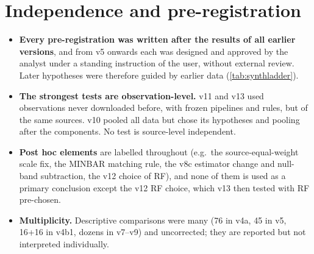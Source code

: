 \section{Independence and pre-registration}
\begin{itemize}
\item \textbf{Every pre-registration was written after the results of all earlier versions}, and from v5 onwards each was designed and
approved by the analyst under a standing instruction of the user, without external review. Later hypotheses were therefore guided by
earlier data (\cref{tab:synthladder}).
\item \textbf{The strongest tests are observation-level.} v11 and v13 used observations never downloaded before, with frozen pipelines and
rules, but of the same sources. v10 pooled all data but chose its hypotheses and pooling after the components. No test is
source-level independent.
\item \textbf{Post hoc elements} are labelled throughout (e.g.\ the source-equal-weight scale fix, the MINBAR matching rule, the v8c estimator
change and null-band subtraction, the v12 choice of RF), and none of them is used as a primary conclusion except the v12 RF choice, which
v13 then tested with RF pre-chosen.
\item \textbf{Multiplicity.} Descriptive comparisons were many (76 in v4a, 45 in v5, 16+16 in v4b1, dozens in v7--v9) and uncorrected; they are
reported but not interpreted individually.
\end{itemize}

